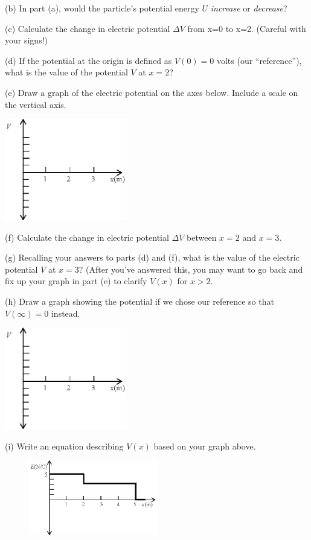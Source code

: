 (b) In part (a), would the particle's potential energy $U$ \textit{increase} or \textit{decrease}?
\answerspace{0.7in}

(c) Calculate the change in electric potential $\Delta V$ from x=0 to x=2. (Careful with your signs!)
\answerspace{0.9in}

(d) If the potential at the origin is defined as $V(0)=0$ volts (our ``reference''), what is the value of the potential $V$ at $x=2$?
\answerspace{0.7in}

\pagebreak
(e) Draw a graph of the electric potential on the axes below.  Include a scale on the vertical axis.
\begin{center}
\includegraphics[width=0.4\textwidth]{finding_v_from_e/fig2.eps}
\end{center}

(f) Calculate the change in electric potential $\Delta V$ between $x=2$ and $x=3$.
\answerspace{0.5in}

(g) Recalling your answers to parts (d) and (f), what is the value of the electric potential $V$ at $x=3$?  (After you've answered this, you may want to go back and fix up your graph in part (e) to clarify $V(x)$ for $x>2$.
\answerspace{0.7in}

(h) Draw a graph showing the potential if we chose our reference so that $V(\infty)=0$ instead.  
\begin{center}
\includegraphics[width=0.4\textwidth]{finding_v_from_e/fig2.eps}
\end{center}
(i) Write an equation describing $V(x)$ based on your graph above.
\answerspace{0.9in}

\pagebreak
\begin{figure}
    \includegraphics[width=0.5\textwidth]{finding_v_from_e/fig3.eps}
\end{figure}

